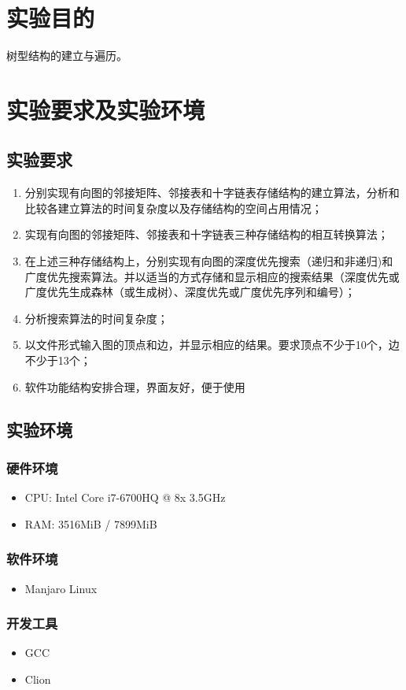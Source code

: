 \section{实验目的}
树型结构的建立与遍历。

\section{实验要求及实验环境}
\subsection{实验要求}
\begin{enumerate}
    \item 分别实现有向图的邻接矩阵、邻接表和十字链表存储结构的建立算法，分析和比较各建立算法的时间复杂度以及存储结构的空间占用情况；
    \item 实现有向图的邻接矩阵、邻接表和十字链表三种存储结构的相互转换算法；
    \item 在上述三种存储结构上，分别实现有向图的深度优先搜索（递归和非递归)和广度优先搜索算法。并以适当的方式存储和显示相应的搜索结果（深度优先或广度优先生成森林（或生成树）、深度优先或广度优先序列和编号）；
    \item 分析搜索算法的时间复杂度；
    \item 以文件形式输入图的顶点和边，并显示相应的结果。要求顶点不少于10个，边不少于13个；
    \item 软件功能结构安排合理，界面友好，便于使用
\end{enumerate}

\subsection{实验环境}
\subsubsection{硬件环境}
\begin{itemize}
    \item CPU: Intel Core i7-6700HQ @ 8x 3.5GHz
    \item RAM: 3516MiB / 7899MiB
\end{itemize}

\subsubsection{软件环境}
\begin{itemize}
    \item Manjaro Linux
\end{itemize}

\subsubsection{开发工具}
\begin{itemize}
    \item GCC
    \item Clion
\end{itemize}
